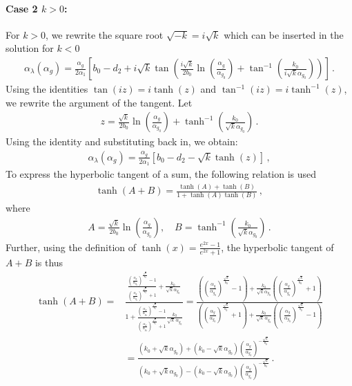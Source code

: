 \paragraph{Case 2 $k > 0$:}
For $k>0$, we rewrite the square root $\sqrt{-k} = i\sqrt{k}$ which can be inserted in the solution for $k<0$
\begin{align}
    \alpha_{\lambda}(\alpha_g) = \frac{\alpha_g}{2\alpha_1} \left[ b_0 - d_2 + i\sqrt{k} \tan \left( \frac{i\sqrt{k}}{2b_0} \ln \left( \frac{\alpha_g}{\alpha_{g_0}} \right) + \tan^{-1} \left( \frac{k_0}{i\sqrt{k} \alpha_{g_0}} \right) \right) \right]\,.
\end{align}
Using the identities \(\tan(iz) = i\tanh(z)\) and \(\tan^{-1}(iz) = i\tanh^{-1}(z)\), we rewrite the argument of the tangent. Let
\begin{align}
z = \frac{\sqrt{k}}{2b_0} \ln \left( \frac{\alpha_g}{\alpha_{g_0}} \right) + \tanh^{-1} \left( \frac{k_0}{\sqrt{k} \alpha_{g_0}} \right)\,.
\end{align}
Using the identity and substituting back in, we obtain:
\begin{align}
\alpha_{\lambda}(\alpha_g) = \frac{\alpha_g}{2\alpha_1} \left[ b_0 - d_2 - \sqrt{k} \tanh(z) \right]\,,
\end{align}
To express the hyperbolic tangent of a sum, the following relation is used
\begin{align}
\tanh(A+B) = \frac{\tanh(A) + \tanh(B)}{1 + \tanh(A)\tanh(B)}\,,
\end{align}
where
\begin{align}
A = \frac{\sqrt{k}}{2b_0} \ln \left( \frac{\alpha_g}{\alpha_{g_0}} \right), \quad 
B = \tanh^{-1} \left( \frac{k_0}{\sqrt{k}\alpha_{g_0}} \right)\,.
\end{align}
Further, using the definition of $\tanh\left(x\right)=\frac{e^{2x}-1}{e^{2x}+1}$, the hyperbolic tangent of $A+B$ is thus
\begin{align}
    \tanh(A+B)=&\frac{ \frac{ \left( \frac{\alpha_g}{\alpha_{g_0}}\right)^{\frac{\sqrt{k}}{b_0}} - 1 }{ \left(\frac{\alpha_g}{\alpha_{g_0}} \right)^{\frac{\sqrt{k}}{b_0}} + 1 } + \frac{k_0}{\sqrt{k} \alpha_{g_0}} }{ 1 +\frac{ \left( \frac{\alpha_g}{\alpha_{g_0}} \right)^{\frac{\sqrt{k}}{b_0}} - 1 }{ \left(\frac{\alpha_g}{\alpha_{g_0}} \right)^{\frac{\sqrt{k}}{b_0}} + 1 }  \frac{k_0}{\sqrt{k} \, \alpha_{g_0}} }
    = \frac{
  \left( \left( \frac{\alpha_g}{\alpha_{g_0}}  \right)^{\frac{\sqrt{k}}{b_0}} - 1 \right) 
  + \frac{k_0}{\sqrt{k}\alpha_{g_0}} \left( \left( \frac{\alpha_g}{\alpha_{g_0}} \right)^{\frac{\sqrt{k}}{b_0}} + 1 \right)
}{
  \left( \left( \frac{\alpha_g}{\alpha_{g_0}}  \right)^{\frac{\sqrt{k}}{b_0}} + 1 \right) 
  + \frac{k_0}{\sqrt{k} \, \alpha_{g_0}} \left( \left( \frac{\alpha_g}{\alpha_{g_0}}  \right)^{\frac{\sqrt{k}}{b_0}} - 1 \right)
}\nonumber
\\&=  \frac{
   (k_0+\sqrt{k}\alpha_{g_0})+(k_0- \sqrt{k}\alpha_{g_0})\left(  \frac{\alpha_g}{\alpha_{g_0}}  \right)^{-\frac{\sqrt{k}}{b_0}}
}{
  (k_0+\sqrt{k}\alpha_{g_0})-(k_0- \sqrt{k}\alpha_{g_0} )\left(  \frac{\alpha_g}{\alpha_{g_0}}  \right)^{-\frac{\sqrt{k}}{b_0}} 
}\,.
\end{align}
